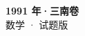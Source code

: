 \documentclass[zihao=-4, a4paper]{ctexart}
\begin{document}
\begin{center}
  {\Large\bfseries 1991 年·三南卷}\\[4pt]
  {\large 数学 · 试题版}
\end{center}
\medskip
{}

\end{document}
